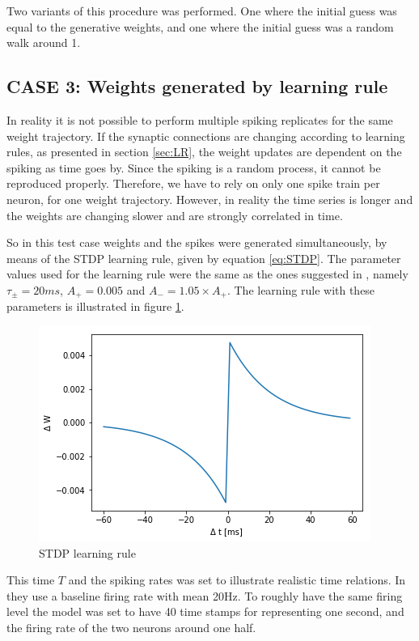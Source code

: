 Two variants of this procedure was performed. One where the initial guess was equal to the generative weights, and one where the initial guess was a random walk around 1. 

\subsection{CASE 3: Weights generated by learning rule}
In reality it is not possible to perform multiple spiking replicates for the same weight trajectory. If the synaptic connections are changing according to learning rules, as presented in section \ref{sec:LR}, the weight updates are dependent on the spiking as time goes by. Since the spiking is a random process, it cannot be reproduced properly. Therefore, we have to rely on only one spike train per neuron, for one weight trajectory. However, in reality the time series is longer and the weights are changing slower and are strongly correlated in time. 

So in this test case weights and the spikes were generated simultaneously, by means of the STDP learning rule, given by equation \ref{eq:STDP}. The parameter values used for the learning rule were the same as the ones suggested in \cite{Song}, namely $\tau_{\pm} = 20 ms$, $A_+ = 0.005$ and $A_- = 1.05 \times A_+$. The learning rule with these parameters is illustrated in figure \ref{fig:LR}.

\begin{figure}[hbt!]
\caption{STDP learning rule}
\label{fig:LR}
    \centering
    \includegraphics[scale=0.8]{fig/Learning_rule2.png}
\end{figure}

This time $T$ and the spiking rates was set to illustrate realistic time relations. In \cite{Linderman} they use a baseline firing rate with mean 20Hz. To roughly have the same firing level the model was set to have 40 time stamps for representing one second, and the firing rate of the two neurons around one half. 

